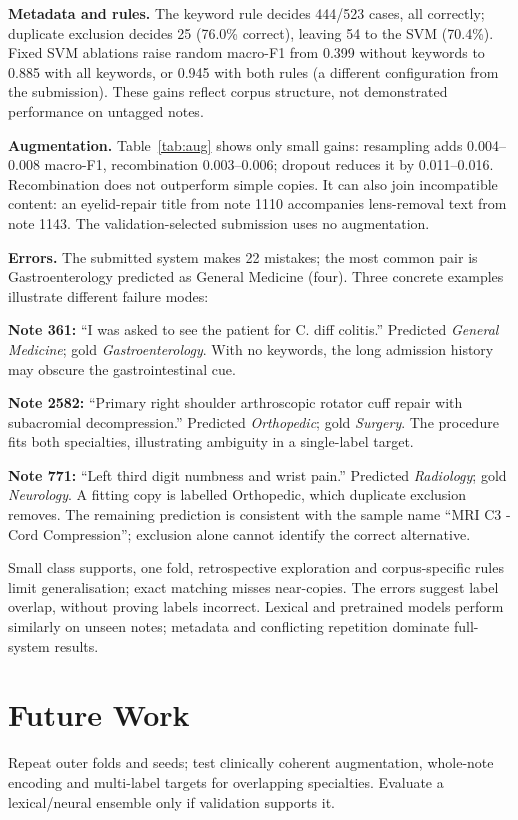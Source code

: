 \documentclass[twocolumn,10pt]{article}
\begin{document}
\textbf{Metadata and rules.} The keyword rule decides 444/523 cases, all correctly; duplicate exclusion decides 25 (76.0\% correct), leaving 54 to the SVM (70.4\%). Fixed SVM ablations raise random macro-F1 from 0.399 without keywords to 0.885 with all keywords, or 0.945 with both rules (a different configuration from the submission). These gains reflect corpus structure, not demonstrated performance on untagged notes.

\textbf{Augmentation.} Table~\ref{tab:aug} shows only small gains: resampling adds 0.004--0.008 macro-F1, recombination 0.003--0.006; dropout reduces it by 0.011--0.016. Recombination does not outperform simple copies. It can also join incompatible content: an eyelid-repair title from note 1110 accompanies lens-removal text from note 1143. The validation-selected submission uses no augmentation.

\textbf{Errors.} The submitted system makes 22 mistakes; the most common pair is Gastroenterology predicted as General Medicine (four). Three concrete examples illustrate different failure modes:

\textbf{Note 361:} ``I was asked to see the patient for C. diff colitis.'' Predicted \emph{General Medicine}; gold \emph{Gastroenterology}. With no keywords, the long admission history may obscure the gastrointestinal cue.

\textbf{Note 2582:} ``Primary right shoulder arthroscopic rotator cuff repair with subacromial decompression.'' Predicted \emph{Orthopedic}; gold \emph{Surgery}. The procedure fits both specialties, illustrating ambiguity in a single-label target.

\textbf{Note 771:} ``Left third digit numbness and wrist pain.'' Predicted \emph{Radiology}; gold \emph{Neurology}. A fitting copy is labelled Orthopedic, which duplicate exclusion removes. The remaining prediction is consistent with the sample name ``MRI C3 - Cord Compression''; exclusion alone cannot identify the correct alternative.

Small class supports, one fold, retrospective exploration and corpus-specific rules limit generalisation; exact matching misses near-copies. The errors suggest label overlap, without proving labels incorrect. Lexical and pretrained models perform similarly on unseen notes; metadata and conflicting repetition dominate full-system results.

\section{Future Work}
Repeat outer folds and seeds; test clinically coherent augmentation, whole-note encoding and multi-label targets for overlapping specialties. Evaluate a lexical/neural ensemble only if validation supports it.
\end{document}
